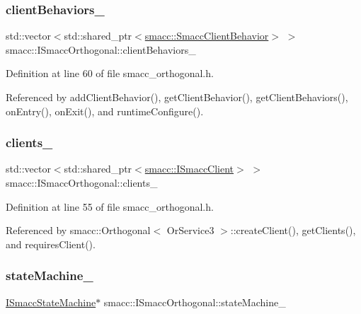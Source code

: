 \subsubsection{\texorpdfstring{client\+Behaviors\+\_\+}{clientBehaviors\_}}
{\footnotesize\ttfamily std\+::vector$<$std\+::shared\+\_\+ptr$<$\hyperlink{classsmacc_1_1SmaccClientBehavior}{smacc\+::\+Smacc\+Client\+Behavior}$>$ $>$ smacc\+::\+I\+Smacc\+Orthogonal\+::client\+Behaviors\+\_\+\hspace{0.3cm}{\ttfamily [private]}}



Definition at line 60 of file smacc\+\_\+orthogonal.\+h.



Referenced by add\+Client\+Behavior(), get\+Client\+Behavior(), get\+Client\+Behaviors(), on\+Entry(), on\+Exit(), and runtime\+Configure().

\mbox{\label{classsmacc_1_1ISmaccOrthogonal_a0f270e9c8c126198f6bce542ab4e04ba}} 
\subsubsection{\texorpdfstring{clients\+\_\+}{clients\_}}
{\footnotesize\ttfamily std\+::vector$<$std\+::shared\+\_\+ptr$<$\hyperlink{classsmacc_1_1ISmaccClient}{smacc\+::\+I\+Smacc\+Client}$>$ $>$ smacc\+::\+I\+Smacc\+Orthogonal\+::clients\+\_\+\hspace{0.3cm}{\ttfamily [protected]}}



Definition at line 55 of file smacc\+\_\+orthogonal.\+h.



Referenced by smacc\+::\+Orthogonal$<$ Or\+Service3 $>$\+::create\+Client(), get\+Clients(), and requires\+Client().

\mbox{\label{classsmacc_1_1ISmaccOrthogonal_a418b2e094a65013444ec1fca7e94f28d}} 
\subsubsection{\texorpdfstring{state\+Machine\+\_\+}{stateMachine\_}}
{\footnotesize\ttfamily \hyperlink{classsmacc_1_1ISmaccStateMachine}{I\+Smacc\+State\+Machine}$\ast$ smacc\+::\+I\+Smacc\+Orthogonal\+::state\+Machine\+\_\+\hspace{0.3cm}{\ttfamily [private]}}



